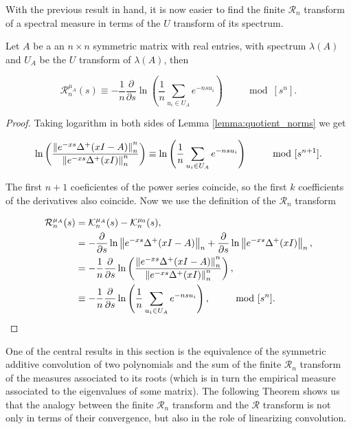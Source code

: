 With the previous result in hand, it is now easier to find the finite $\mathcal R_n$ transform of a spectral measure in terms of the $U$ transform of its spectrum.


\begin{corollary} \label{corollary:R_n_as_a_logarithm}
    Let $A$ be a an $n\times n$ symmetric matrix with real entries, with spectrum $\lambda(A)$ and $U_A$ be the $U$ transform of $\lambda(A)$, then 

    \begin{equation*}
        \mathcal R_{n}^{\mu_A}(s) \equiv - \frac1n \frac{\partial}{\partial s} \ln \left(\frac1n \sum_{u_i \in U_A} e^{-nsu_i} \right) \qquad \mod [s^n].
    \end{equation*}
\end{corollary}

\begin{proof}
    Taking logarithm in both sides of Lemma \ref{lemma:quotient_norms} we get 

    \begin{equation*}
        \ln \left( \frac{\left\lVert e^{-xs}\Delta^+(xI - A)\right\rVert_n^n}{\left\lVert e^{-xs}\Delta^+(xI)\right\rVert_n^n} \right) \equiv \ln\left( \frac1n\sum_{u_i \in U_A} e^{-ns u_i} \right) \qquad \mod [s^{n+1}].
    \end{equation*}

    The first $n+1$ coeficientes of the power series coincide, so the first $k$ coefficients of the derivatives also coincide. Now we use the definition of the $\mathcal R_n$ transform

    \begin{align*}
        \mathcal R_{n}^{\mu_A}(s) &= \mathcal K_{n}^{\mu_A}(s) - \mathcal K_n^{\mu_0}(s), \\
        &= - \frac{\partial}{\partial s} \ln \left\lVert e^{-xs}\Delta^+(xI -A) \right\rVert_n + \frac{\partial}{\partial s} \ln \left\lVert e^{-xs}\Delta^+(xI) \right\rVert_n,\\
        &= - \frac1n \frac{\partial}{\partial s} \ln \left( \frac{\left\lVert e^{-xs}\Delta^+(xI -A)\right\rVert_n^n}{ \left\lVert e^{-xs}\Delta^+(xI)\right\rVert_n^n } \right), \\
        &\equiv -\frac1n \frac{\partial}{\partial s} \ln \left( \frac1n \sum_{u_i \in U_A} e^{-nsu_i} \right), \qquad \mod[s^n].
    \end{align*}
\end{proof}

One of the central results in this section is the equivalence of the symmetric additive convolution of two polynomials and the sum of the finite $\mathcal R_n$ transform of the measures associated to its roots (which is in turn the empirical measure associated to the eigenvalues of some matrix). The following Theorem shows us that the analogy between the finite $\mathcal R_n$ transform and the $\mathcal R$ transform is not only in terms of their convergence, but also in the role of linearizing convolution. 


